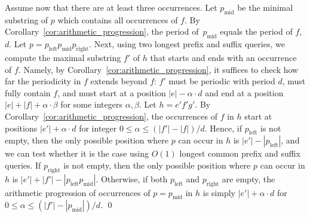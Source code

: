 Assume now that there are at least three occurrences. Let $p_{\text{mid}}$ be the minimal substring of $p$ which contains all occurrences of $f$. By Corollary~\ref{cor:arithmetic_progression}, the period of~$p_{\text{mid}}$ equals the period of $f$, $d$. Let $p=p_{\text{left}} p_{\text{mid}} p_{\text{right}}$. Next, using two longest prefix and suffix queries, we compute the maximal substring $f'$ of $h$ that starts and ends with an occurrence of $f$. Namely, by Corollary~\ref{cor:arithmetic_progression}, it suffices to check how far the periodicity in $f$ extends beyond $f$: $f'$ must be periodic with period $d$, must fully contain $f$, and must start at a position $|e|-\alpha \cdot d$ and end at a position $|e|+|f|+\alpha \cdot \beta$ for some integers $\alpha, \beta$. Let $h = e'f'g'$. By Corollary~\ref{cor:arithmetic_progression}, the occurrences of $f$ in $h$ start at positions $|e'| + \alpha \cdot d$ for integer $0 \leq \alpha \leq (|f'|-|f|)/d$. Hence, if $p_{\text{left}}$ is not empty, then the only possible position where $p$ can occur in $h$ is $|e'|-|p_{\text{left}}|$, and we can test whether it is the case using $O(1)$ longest common prefix and suffix queries. If $p_{\text{right}}$ is not empty, then the only possible position where $p$ can occur in $h$ is $|e'|+|f'|-|p_{\text{left}} p_{\text{mid}}|$. Otherwise, if both $p_{\text{left}}$ and $p_{\text{right}}$ are empty, the arithmetic progression of occurrences of $p=p_{\text{mid}}$ in $h$ is simply $|e'|+\alpha \cdot d$ for $0 \leq \alpha \leq (|f'|-|p_{\text{mid}}|)/d$. 
\qed